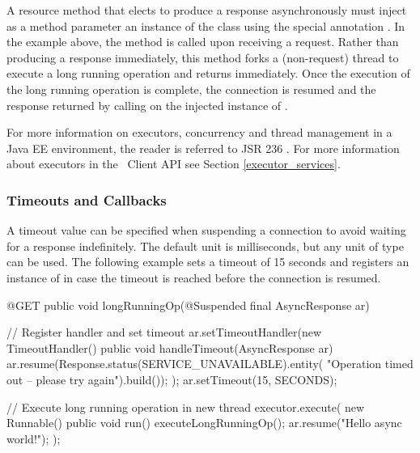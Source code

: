 A resource method that elects to produce a response asynchronously must inject as a method parameter an instance of the class  using the special annotation \Suspended. In the example above, the method  is called upon receiving a  request. Rather than producing a response immediately, this method forks a (non-request) thread to execute a long running operation and returns immediately. Once the execution of the long running operation is complete, the connection is resumed and the response returned by calling  on the injected instance of . 

For more information on executors, concurrency and thread management in a Java EE environment, the reader is referred to JSR 236 \cite{concurrencyee}. For more information about executors in the \jaxrs\ Client API see Section \ref{executor_services}.

\subsubsection{Timeouts and Callbacks}
\label{timeouts_and_callbacks}

A timeout value can be specified when suspending a connection to avoid waiting for a response indefinitely. The default unit is milliseconds, but any unit of type  can be used. The following example sets a timeout of 15 seconds and registers an instance of  in case the timeout is reached before the connection is resumed.

\begin{listing}{1}
    @GET
    public void longRunningOp(@Suspended final AsyncResponse ar) {
        // Register handler and set timeout
        ar.setTimeoutHandler(new TimeoutHandler() {
            public void handleTimeout(AsyncResponse ar) {
                ar.resume(Response.status(SERVICE_UNAVAILABLE).entity(
                    "Operation timed out -- please try again").build());                    
                }
        });
        ar.setTimeout(15, SECONDS);
        
        // Execute long running operation in new thread
        executor.execute(
            new Runnable() {
                public void run() {
                    executeLongRunningOp();
                    ar.resume("Hello async world!");
                } 
            });
    }
\end{listing}

